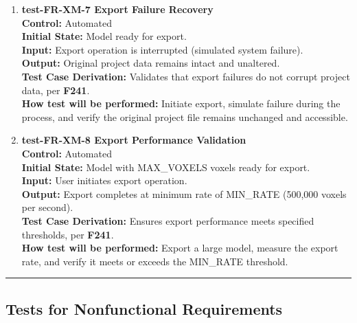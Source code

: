 \documentclass[12pt, titlepage]{article}
\begin{document}
\begin{enumerate}
  \item \textbf{test-FR-XM-7 Export Failure Recovery} \\[2mm]
    \textbf{Control:} Automated \\ 
    \textbf{Initial State:} Model ready for export. \\ 
    \textbf{Input:} Export operation is interrupted (simulated system failure). \\ 
    \textbf{Output:} Original project data remains intact and unaltered. \\[2mm]
    \textbf{Test Case Derivation:} Validates that export failures do not corrupt project data, per \textbf{F241}. \\[2mm]
    \textbf{How test will be performed:} Initiate export, simulate failure during the process, and verify the original project file remains unchanged and accessible.

  \item \textbf{test-FR-XM-8 Export Performance Validation} \\[2mm]
    \textbf{Control:} Automated \\ 
    \textbf{Initial State:} Model with MAX\_VOXELS voxels ready for export. \\ 
    \textbf{Input:} User initiates export operation. \\ 
    \textbf{Output:} Export completes at minimum rate of MIN\_RATE (500,000 voxels per second). \\[2mm]
    \textbf{Test Case Derivation:} Ensures export performance meets specified thresholds, per \textbf{F241}. \\[2mm]
    \textbf{How test will be performed:} Export a large model, measure the export rate, and verify it meets or exceeds the MIN\_RATE threshold.

\end{enumerate}

\noindent\rule{\textwidth}{0.5pt}

\subsection{Tests for Nonfunctional Requirements}
\iffalse
{}

\end{document}
